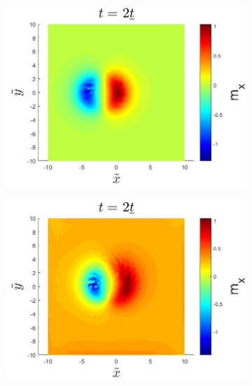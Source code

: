 \begin{figure}[h!]
\centering
\begin{subfigure}{.45\textwidth}
  \centering
  \includegraphics[width=\linewidth]{Figures/SkyrmionMxRSOCR0.jpg}
  \caption{}
\end{subfigure}
\begin{subfigure}{.45\textwidth}
  \centering
  \includegraphics[width=\linewidth]{Figures/SkyrmionMxRSOC.jpg}
  \caption{}
\end{subfigure}


\end{figure}
